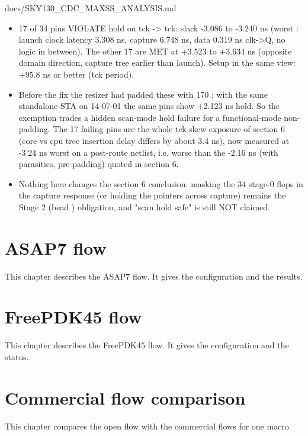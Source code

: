 \begin{relocated}{docs/SKY130_CDC_MAXSS_ANALYSIS.md}
\begin{itemize}
\tightlist
\item
  17 of 34 pins VIOLATE hold on tck -\textgreater{} tck: slack -3.086 to
  -3.240 ns (worst : launch clock latency 3.308 ns,
  capture 6.748 ns, data 0.319 ns clk-\textgreater Q, no logic in
  between). The other 17 are MET at +3.523 to +3.634 ns (opposite domain
  direction, capture tree earlier than launch). Setup in the same view:
  +95.8 ns or better (tck period).
\item
  Before the fix the resizer had padded these with 170
  ; with the same standalone STA on 14-07-01 the
  same pins show +2.123 ns hold. So the exemption trades a hidden
  scan-mode hold failure for a functional-mode non-padding. The 17
  failing pins are the whole tck-skew exposure of section 6 (core vs cpu
  tree insertion delay differs by about 3.4 ns), now measured at -3.24
  ns worst on a post-route netlist, i.e. worse than the -2.16 ns (with
  parasitics, pre-padding) quoted in section 6.
\item
  Nothing here changes the section 6 conclusion: masking the 34 stage-0
  flops in the capture response (or holding the pointers across capture)
  remains the Stage 2 (bead ) obligation, and "scan hold safe" is
  still NOT claimed.
\end{itemize}
\end{relocated}

\chapter{ASAP7 flow}\label{tm:ch:asap7-flow}

This chapter describes the ASAP7 flow. It gives the configuration and the results.

\chapter{FreePDK45 flow}\label{tm:ch:freepdk45-flow}

This chapter describes the FreePDK45 flow. It gives the configuration and the status.

\chapter{Commercial flow comparison}\label{tm:ch:commercial-flow-comparison}

This chapter compares the open flow with the commercial flows for one macro.

